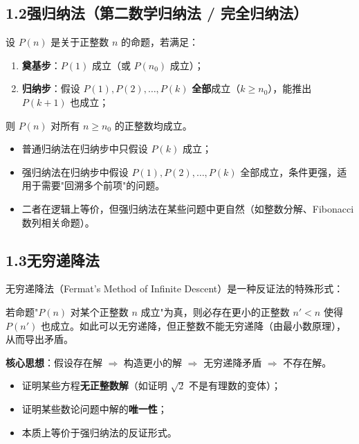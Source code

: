 \documentclass[12pt, a4paper]{ctexart}
\begin{document}
\subsection*{1.2\quad 强归纳法（第二数学归纳法 / 完全归纳法）}

\begin{knowledgebox}[强归纳法原理]
设 $P(n)$ 是关于正整数 $n$ 的命题，若满足：
\begin{enumerate}[label=(\arabic*)]
  \item \textbf{奠基步}：$P(1)$ 成立（或 $P(n_0)$ 成立）；
  \item \textbf{归纳步}：假设 $P(1), P(2), \ldots, P(k)$ \textbf{全部}成立（$k \geq n_0$），能推出 $P(k+1)$ 也成立；
\end{enumerate}
则 $P(n)$ 对所有 $n \geq n_0$ 的正整数均成立。
\end{knowledgebox}

\begin{tipbox}[强归纳法与普通归纳法的区别]
\begin{itemize}
  \item 普通归纳法在归纳步中只假设 $P(k)$ 成立；
  \item 强归纳法在归纳步中假设 $P(1), P(2), \ldots, P(k)$ 全部成立，条件更强，适用于需要"回溯多个前项"的问题。
  \item 二者在逻辑上等价，但强归纳法在某些问题中更自然（如整数分解、Fibonacci 数列相关命题）。
\end{itemize}
\end{tipbox}

\subsection*{1.3\quad 无穷递降法}

\begin{knowledgebox}[无穷递降法原理]
无穷递降法（Fermat's Method of Infinite Descent）是一种反证法的特殊形式：

若命题"$P(n)$ 对某个正整数 $n$ 成立"为真，则必存在更小的正整数 $n' < n$ 使得 $P(n')$ 也成立。如此可以无穷递降，但正整数不能无穷递降（由最小数原理），从而导出矛盾。

\medskip
\textbf{核心思想}：假设存在解 $\Rightarrow$ 构造更小的解 $\Rightarrow$ 无穷递降矛盾 $\Rightarrow$ 不存在解。
\end{knowledgebox}

\begin{tipbox}[无穷递降法的适用场景]
\begin{itemize}
  \item 证明某些方程\textbf{无正整数解}（如证明 $\sqrt{2}$ 不是有理数的变体）；
  \item 证明某些数论问题中解的\textbf{唯一性}；
  \item 本质上等价于强归纳法的反证形式。
\end{itemize}
\end{tipbox}
\end{document}
